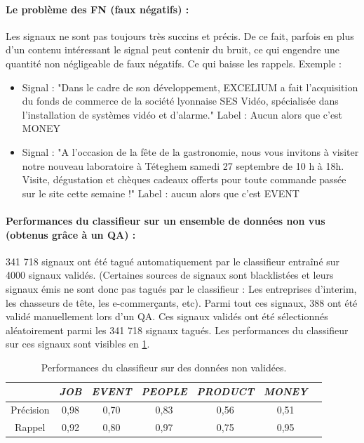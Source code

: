                 \paragraph{Le problème des FN (faux négatifs) :}
                    Les signaux ne sont pas toujours très succins et précis. De ce fait, parfois en plus d'un contenu intéressant le signal peut contenir du bruit, ce qui engendre une quantité non négligeable de faux négatifs. Ce qui baisse les rappels. Exemple :
                    \begin{itemize}
                        \item Signal : "Dans le cadre de son développement, EXCELIUM a fait l'acquisition du fonds de commerce de la société lyonnaise SES Vidéo, spécialisée dans l'installation de systèmes vidéo et d'alarme." Label : Aucun alors que c'est MONEY
                        \item Signal : "A l'occasion de la fête de la gastronomie, nous vous invitons à visiter notre nouveau laboratoire à Téteghem samedi 27 septembre de 10 h à 18h. Visite, dégustation et chèques cadeaux offerts pour toute commande passée sur le site cette semaine !" Label : aucun alors que c'est EVENT
                    \end{itemize}

                \paragraph{Performances du classifieur sur un ensemble de données non vus (obtenus grâce à un QA) :}
                    341 718 signaux ont été tagué automatiquement par le classifieur entraîné sur 4000 signaux validés.
                    (Certaines sources de signaux sont blacklistées et leurs signaux émis ne sont donc pas tagués par le classifieur : Les entreprises d'interim, les chasseurs de tête, les e-commerçants, etc). Parmi tout ces signaux, 388 ont été validé manuellement lors d'un QA. Ces signaux validés ont été sélectionnés aléatoirement parmi les 341 718 signaux tagués. Les performances du classifieur sur ces signaux sont visibles en \ref{tab:classif_perf4}.
                    \begin{table}[t]
                        \centering
                        \begin{tabular}{| c | c | c | c | c | c | c |}
                            \hline
                             & \textit{JOB} & \textit{EVENT} & \textit{PEOPLE} & \textit{PRODUCT} & \textit{MONEY} \\
                            \hline
                            Précision & 0,98 & 0,70 & 0,83 & 0,56 & 0,51 \\
                            Rappel & 0,92 & 0,80 & 0,97 & 0,75 & 0,95 \\
                            \hline
                        \end{tabular}
                        \caption{Performances du classifieur sur des données non validées.}
                        \label{tab:classif_perf4}
                    \end{table}

